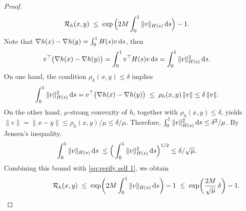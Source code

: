 \documentclass{article}
\theoremstyle{plain}
\theoremstyle{definition}
\theoremstyle{remark}
\newcommand{\cR}{\mathcal{R}}
\begin{document}
\begin{proof}
\begin{equation}
    \cR_h(x,y) 
    \;\leq\;
    \exp\Big(2M \int_0^1 \|v\|_{H(s)}\,{\rm d}s\Big) - 1.
\end{equation}
Note that %
$\nabla h(x) - \nabla h(y)
    = \int_0^1 H(s) v\,{\rm d}s$, then
\[
    v^\top\big(\nabla h(x) - \nabla h(y)\big)
    = \int_0^1 v^\top H(s) v\,{\rm d}s
    = \int_0^1 \|v\|_{H(s)}^2\,{\rm d}s.
\]
On one hand, the condition $\rho_h(x,y)\leq \delta$ implies %
\[
    \int_0^1 \|v\|_{H(s)}^2\,{\rm d}s = v^\top\big(\nabla h(x) - \nabla h(y)\big)
    \;\le\;
    \rho_h(x,y)\,\|v\|
    \leq \delta\,\|v\|.
\]
On the other hand, $\mu$-strong convexity of $h$, together with $\rho_h(x,y)\leq \delta$, yields
$
\|v\| = \|x-y\| \leq \rho_h(x,y)/\mu \leq \delta/\mu$. 
Therefore, $ \int_0^1 \|v\|_{H(s)}^2\,{\rm d}s \leq \delta^2/\mu$. By Jensen's inequality,
\[
    \int_0^1 \|v\|_{H(s)}\,{\rm d}s
    \;\leq \Big(\int_0^1 \|v\|_{H(s)}^2\,{\rm d}s\Big)^{1/2} \leq \delta/\sqrt{\mu}.
\]
Combining this bound with \eqref{eq:verify self 1}, we obtain
\[
   \hspace{2cm}\cR_h(x,y) 
    \;\leq\;
    \exp\!\bigg(2M \int_0^1 \|v\|_{H(s)}\,{\rm d}s\bigg) - 1
    \;\leq\;
    \exp\!\bigg(\frac{2M}{\sqrt{\mu}}\,\delta\bigg) - 1.
\]
\end{proof}
\end{document}
